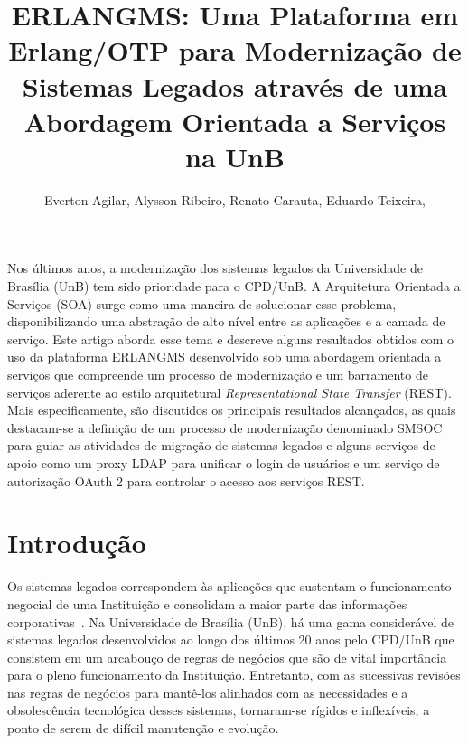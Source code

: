 \documentclass[12pt]{article}
\title{ERLANGMS: Uma Plataforma em Erlang/OTP para 
Modernização de Sistemas Legados através de uma Abordagem Orientada a Serviços na UnB}
\author{
	Everton Agilar\inst{1},
	Alysson Ribeiro\inst{1},
	Renato Carauta\inst{1},
	Eduardo Teixeira\inst{1},
}
\begin{document}
 

\maketitle


     
\begin{resumo} 
Nos últimos anos, a modernização dos sistemas legados da Universidade de Brasília (UnB) tem sido 
prioridade para o CPD/UnB. 
A Arquitetura Orientada a Serviços (SOA) surge como uma maneira de solucionar 
esse problema, disponibilizando uma abstração de alto nível entre as aplicações e a camada de serviço.
Este artigo aborda esse tema e descreve alguns resultados obtidos com o uso 
da plataforma ERLANGMS desenvolvido sob 
uma abordagem orientada a serviços que compreende um processo 
de moderniza\c c\~{a}o e um barramento de serviços aderente ao estilo 
arquitetural \textit{Representational State Transfer} (REST). 
Mais especificamente, são discutidos os principais resultados alcançados, 
as quais destacam-se a definição de um processo de modernização denominado SMSOC 
para guiar as atividades de 
migração de sistemas legados 
e alguns serviços de apoio 
como um proxy LDAP para unificar o login de usuários e 
um serviço de autorização OAuth 2
para controlar o acesso aos serviços REST.
\end{resumo}


\section{Introdução}

Os sistemas legados correspondem às aplicações que sustentam o funcionamento 
negocial de uma Instituição e consolidam a maior parte das informações corporativas~\cite{S4_bennett1995legacy}. 
Na Universidade de Brasília (UnB), há uma gama considerável de sistemas legados desenvolvidos 
ao longo dos últimos 20 anos pelo CPD/UnB que consistem em um arcabouço 
de regras de negócios que são de vital importância para o 
pleno funcionamento da Instituição. Entretanto, com as 
sucessivas revisões nas regras de negócios para mantê-los alinhados
com as necessidades e a obsolescência tecnológica desses sistemas, 
tornaram-se rígidos e inflexíveis, a ponto de serem de difícil manutenção e evolução. 
\end{document}

